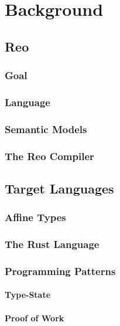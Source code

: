 \chapter{Background}

\section{Reo}
\subsection{Goal}
\subsection{Language}
\subsection{Semantic Models}
\subsection{The Reo Compiler}


\section{Target Languages}
\subsection{Affine Types}
\subsection{The Rust Language}
\subsection{Programming Patterns}
\subsubsection{Type-State}
\subsubsection{Proof of Work}